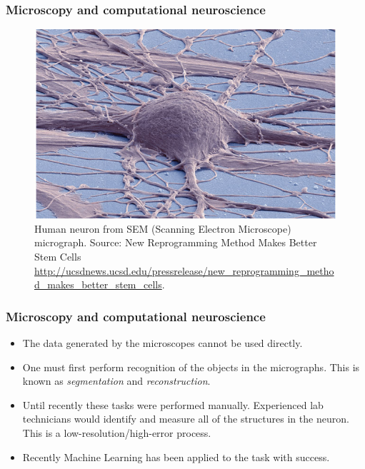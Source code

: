 \documentclass{beamer}
\begin{document}
\begin{frame}
\frametitle{Microscopy and computational neuroscience}

\begin{figure}[H]
    \centering
    \includegraphics[scale=2]{../blog/images/2014_06_26_human_ipsc_derived_neuron_deerinck}
    \caption{Human neuron from SEM (Scanning Electron Microscope) micrograph. Source: New Reprogramming Method Makes Better Stem Cells
      \url{http://ucsdnews.ucsd.edu/pressrelease/new_reprogramming_method_makes_better_stem_cells}.}
    \label{fig:3d_neuron}
\end{figure}

\end{frame}

\begin{frame}
\frametitle{Microscopy and computational neuroscience}

\begin{itemize}
\item The data generated by the microscopes cannot be used
  directly.
\pause
\item One must first perform recognition of the objects in the
  micrographs. This is known as \emph{segmentation} and
  \emph{reconstruction}.
\pause
\item Until recently these tasks were performed manually. Experienced
  lab technicians would identify and measure all of the structures in
  the neuron. This is a low-resolution/high-error process.
\pause
\item Recently Machine Learning has been applied to the task with
  success.
\end{itemize}

\end{frame}
\end{document}
